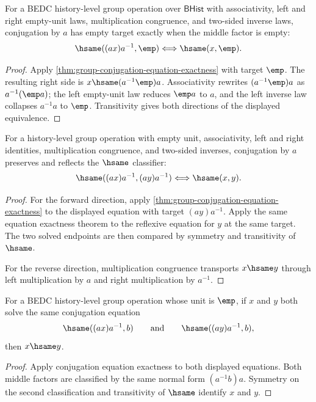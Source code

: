 \begin{theorem}
\label{thm:group-conjugation-empty-exact}
For a BEDC history-level group operation over $\mathsf{BHist}$ with
associativity, left and right empty-unit laws, multiplication congruence, and
two-sided inverse laws, conjugation by $a$ has empty target exactly when the
middle factor is empty:
$$
\hsame((a x)a^{-1},\emp) \Longleftrightarrow \hsame(x,\emp).
$$
\end{theorem}
\begin{proof}
Apply \autoref{thm:group-conjugation-equation-exactness} with target
$\emp$. The resulting right side is
$x\hsame (a^{-1}\emp)a$. Associativity rewrites
$(a^{-1}\emp)a$ as $a^{-1}(\emp a)$; the left empty-unit law reduces
$\emp a$ to $a$, and the left inverse law collapses $a^{-1}a$ to $\emp$.
Transitivity gives both directions of the displayed equivalence.
\end{proof}

\begin{theorem}
\label{thm:group-conjugation-classifier-exactness}
For a history-level group operation with empty unit, associativity, left and
right identities, multiplication congruence, and two-sided inverses,
conjugation by $a$ preserves and reflects the $\hsame$ classifier:
$$
\hsame((a x)a^{-1},(a y)a^{-1}) \Longleftrightarrow \hsame(x,y).
$$
\end{theorem}
\begin{proof}
For the forward direction, apply
\autoref{thm:group-conjugation-equation-exactness} to the displayed equation
with target $(a y)a^{-1}$. Apply the same equation exactness theorem to the
reflexive equation for $y$ at the same target. The two solved endpoints are
then compared by symmetry and transitivity of $\hsame$.

For the reverse direction, multiplication congruence transports $x\hsame y$
through left multiplication by $a$ and right multiplication by $a^{-1}$.
\end{proof}

\begin{theorem}
\label{thm:group-conjugation-equation-solution-unique}
For a BEDC history-level group operation whose unit is $\emp$, if $x$ and $y$
both solve the same conjugation equation
$$
\hsame((a x)a^{-1},b)
\qquad\text{and}\qquad
\hsame((a y)a^{-1},b),
$$
then $x\hsame y$.
\end{theorem}
\begin{proof}
Apply conjugation equation exactness to both displayed equations. Both middle
factors are classified by the same normal form $(a^{-1}b)a$. Symmetry on the
second classification and transitivity of $\hsame$ identify $x$ and $y$.
\end{proof}

